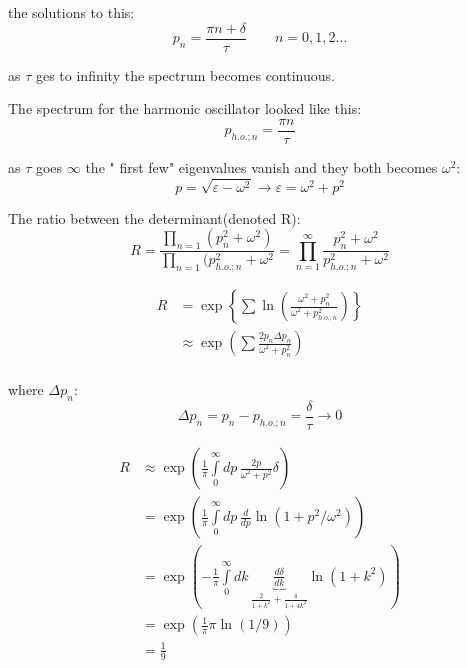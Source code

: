 \documentclass[12pt,a4paper]{article}
\numberwithin{equation}{section}
\begin{document}
the solutions to this:
\begin{equation}
p_n = \frac{\pi n + \delta}{\tau} \qquad n = 0,1,2\dots
\end{equation}

as $\tau$ ges to infinity the spectrum becomes continuous.


The spectrum for the harmonic oscillator looked like this:
\begin{equation}
p_{h.o.;n} = \frac{\pi n }{\tau} 
\end{equation}

as $\tau$ goes $\infty$ the " first few" eigenvalues vanish and they both becomes $\omega^2$:
\begin{equation}
p = \sqrt{\varepsilon - \omega^2} \rightarrow \varepsilon = \omega^2 + p^2
\end{equation}

The ratio between the determinant(denoted R):
\begin{equation}
R = \frac{\prod_{n=1} ( p_n^2 + \omega^2 )}{\prod_{n=1} (p_{h.o.;n}^2 + \omega^2} = \prod_{n=1}^\infty \frac{p_n^2 + \omega^2}{p_{h.o.;n}^2 + \omega^2}
\end{equation}

\begin{align}
R &= \exp \left\lbrace \sum \ln \left( \frac{\omega^2 + p_n^2 }{\omega^2 + p_{h.o.;n}^2}  \right)  \right\rbrace\\
&\approx \exp \left( \sum \frac{2p_n \Delta p_n}{\omega^2 + p_n^2}  \right) \\
\end{align}

where $\Delta p_n$:
\begin{equation}
\Delta p_n = p_n - p_{h.o.;n} = \frac{\delta}{\tau} \rightarrow 0
\end{equation}

\begin{align}
R &\approx \exp \left( \frac{1}{\pi} \int\limits_0^{\infty} dp \, \frac{2p}{\omega^2 + p^2}\delta \right)\\
&= \exp \left( \frac{1}{\pi} \int\limits_0^{\infty} dp \, \frac{d}{dp}\ln (1+p^2 /\omega^2 ) \right)\\
&= \exp \left( -\frac{1}{\pi} \int\limits_0^{\infty} dk \, \underbrace{\frac{d\delta}{dk}}_{\frac{2}{1+k^2} + \frac{4}{1 + 4k^2}} \ln(1+k^2) \right)\\
&= \exp (\frac{1}{\pi} \pi \ln(1/9))\\
&= \frac{1}{9}
\end{align}
\end{document}
